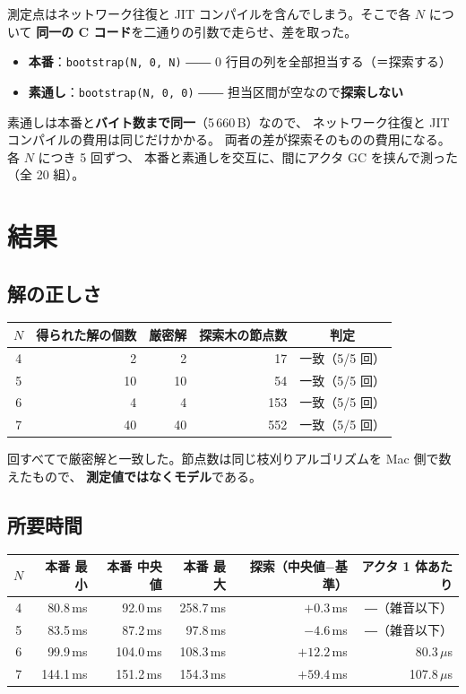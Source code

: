 \documentclass[11pt,a4paper]{ltjsarticle}
\newcommand{\code}[1]{\texttt{\small #1}}
\begin{document}
測定点はネットワーク往復と JIT コンパイルを含んでしまう。そこで各 $N$ について
\textbf{同一の C コード}を二通りの引数で走らせ、差を取った。

\begin{itemize}
\item \textbf{本番}：\code{bootstrap(N, 0, N)} ―― 0 行目の列を全部担当する（＝探索する）
\item \textbf{素通し}：\code{bootstrap(N, 0, 0)} ―― 担当区間が空なので\textbf{探索しない}
\end{itemize}

素通しは本番と\textbf{バイト数まで同一}（5\,660\,B）なので、
ネットワーク往復と JIT コンパイルの費用は同じだけかかる。
両者の差が探索そのものの費用になる。各 $N$ につき 5 回ずつ、
本番と素通しを交互に、間にアクタ GC を挟んで測った（全 20 組）。

\section{結果}

\subsection{解の正しさ}

\begin{center}\small
\begin{tabular}{@{}crrrc@{}}
\toprule
$N$ & 得られた解の個数 & 厳密解 & 探索木の節点数 & 判定 \\
\midrule
4 & 2  & 2  & 17  & 一致（5/5 回） \\
5 & 10 & 10 & 54  & 一致（5/5 回） \\
6 & 4  & 4  & 153 & 一致（5/5 回） \\
7 & 40 & 40 & 552 & 一致（5/5 回） \\
\bottomrule
\end{tabular}
\end{center}

 回すべてで厳密解と一致した。節点数は同じ枝刈りアルゴリズムを Mac 側で数えたもので、
\textbf{測定値ではなくモデル}である。

\subsection{所要時間}

\begin{center}\small
\begin{tabular}{@{}crrrrr@{}}
\toprule
$N$ & 本番 最小 & 本番 中央値 & 本番 最大 & 探索（中央値$-$基準） & アクタ 1 体あたり \\
\midrule
4 & 80.8\,ms  & 92.0\,ms  & 258.7\,ms & $+0.3$\,ms  & ―（雑音以下） \\
5 & 83.5\,ms  & 87.2\,ms  & 97.8\,ms  & $-4.6$\,ms  & ―（雑音以下） \\
6 & 99.9\,ms  & 104.0\,ms & 108.3\,ms & $+12.2$\,ms & 80.3\,$\mu$s \\
7 & 144.1\,ms & 151.2\,ms & 154.3\,ms & $+59.4$\,ms & 107.8\,$\mu$s \\
\bottomrule
\end{tabular}
\end{center}
\end{document}
